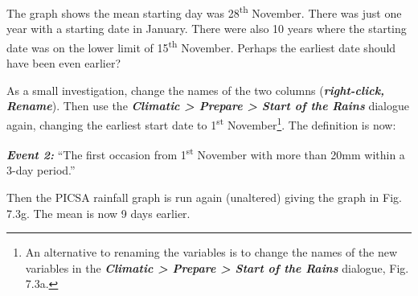 \documentclass[
  letterpaper,
  DIV=11,
  numbers=noendperiod]{scrreprt}
\begin{document}
The graph shows the mean starting day was 28\textsuperscript{th}
November. There was just one year with a starting date in January. There
were also 10 years where the starting date was on the lower limit of
15\textsuperscript{th} November. Perhaps the earliest date should have
been even earlier?

As a small investigation, change the names of the two columns
(\textbf{\emph{right-click, Rename}}). Then use the
\textbf{\emph{Climatic \textgreater{} Prepare \textgreater{} Start of
the Rains}} dialogue again, changing the earliest start date to
1\textsuperscript{st} November\footnote{An alternative to renaming the
  variables is to change the names of the new variables in the
  \textbf{\emph{Climatic \textgreater{} Prepare \textgreater{} Start of
  the Rains}} dialogue, Fig. 7.3a.}. The definition is now:

\textbf{\emph{Event 2:}} ``The first occasion from 1\textsuperscript{st}
November with more than 20mm within a 3-day period.''

Then the PICSA rainfall graph is run again (unaltered) giving the graph
in Fig. 7.3g. The mean is now 9 days earlier.
\end{document}
